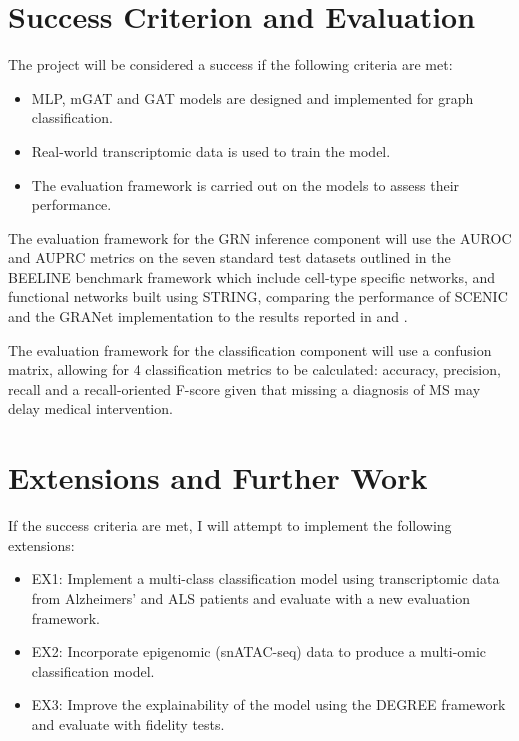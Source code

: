 \documentclass[12pt,a4paper]{report}
\begin{document}
\section{Success Criterion and Evaluation}
The project will be considered a success if the following criteria are met:
\begin{itemize}
    \item MLP, mGAT and GAT models are designed and implemented for graph classification.
    \item Real-world transcriptomic data is used to train the model.
    \item The evaluation framework is carried out on the models to assess their performance.
\end{itemize}
The evaluation framework for the GRN inference component will use the AUROC and AUPRC metrics on the seven standard test datasets outlined in the BEELINE benchmark framework \parencite{pratapaBenchmarkingAlgorithmsGene2020} which include cell-type specific networks, and functional networks built using STRING, comparing the performance of SCENIC and the GRANet implementation to the results reported in\cite{zhouGRANetGraphResidual2025} and \parencite{pratapaBenchmarkingAlgorithmsGene2020}.

The evaluation framework for the classification component will use a confusion matrix, allowing for 4 classification metrics to be calculated: accuracy, precision, recall and a recall-oriented F-score given that missing a diagnosis of MS may delay medical intervention.

\section{Extensions and Further Work}
If the success criteria are met, I will attempt to implement the following extensions:
\begin{itemize}
    \item EX1: Implement a multi-class classification model using transcriptomic data from Alzheimers’
and ALS patients and evaluate with a new evaluation framework.
\item EX2: Incorporate epigenomic (snATAC-seq) data to produce a multi-omic classification
model.
\item EX3: Improve the explainability of the model using the DEGREE framework\parencite{fengDEGREEDecompositionBased2023} and evaluate
with fidelity tests.
\end{itemize}
\end{document}
